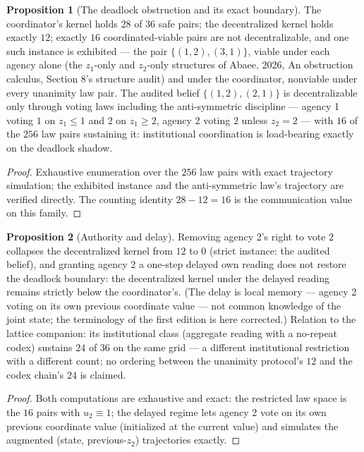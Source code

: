 \documentclass[10pt,twocolumn]{article}
\theoremstyle{definition}
\newtheorem{proposition}{Proposition}
\begin{document}
\begin{proposition}[The deadlock obstruction and its exact boundary]
\label{prop:deadlock}
The coordinator's kernel holds $28$ of $36$ safe pairs; the decentralized
kernel holds exactly $12$; exactly $16$ coordinated-viable pairs are not
decentralizable, and one such instance is exhibited --- the pair $\{(1,2),(3,1)\}$,
viable under each agency alone (the $z_1$-only and $z_2$-only structures
of Abaee, 2026, An obstruction calculus, Section 8's structure audit) and under the coordinator,
nonviable under every unanimity law pair. The audited belief
$\{(1,2),(2,1)\}$ is decentralizable only through voting laws including
the anti-symmetric discipline --- agency 1 voting $1$ on $z_1\le1$ and
$2$ on $z_1\ge2$, agency 2 voting $2$ unless $z_2=2$ --- with $16$ of
the $256$ law pairs sustaining it: institutional coordination is
load-bearing exactly on the deadlock shadow.
\end{proposition}
\begin{proof}
Exhaustive enumeration over the $256$ law pairs with exact trajectory
simulation; the exhibited instance and the anti-symmetric law's
trajectory are verified directly. The counting identity
$28-12=16$ is the communication value on this family.
\end{proof}

\begin{proposition}[Authority and delay]
Removing agency 2's right to vote $2$ collapses the decentralized kernel
from $12$ to $0$ (strict instance: the audited belief), and granting
agency 2 a one-step delayed own reading does not restore the deadlock
boundary: the decentralized kernel under the delayed reading remains
strictly below the coordinator's. (The delay is local memory --- agency 2
voting on its own previous coordinate value --- not common knowledge of
the joint state; the terminology of the first edition is here corrected.)
Relation to the lattice companion: its institutional class (aggregate
reading with a no-repeat codex) sustains $24$ of $36$ on the same grid ---
a different institutional restriction with a different count; no ordering
between the unanimity protocol's $12$ and the codex chain's $24$ is
claimed.
\end{proposition}
\begin{proof}
Both computations are exhaustive and exact: the restricted law space is
the $16$ pairs with $u_2\equiv1$; the delayed regime lets agency 2 vote
on its own previous coordinate value (initialized at the current value)
and simulates the augmented (state, previous-$z_2$) trajectories
exactly.
\end{proof}
\end{document}
